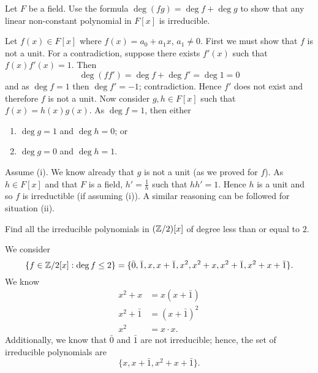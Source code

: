 \setcounter{question}{17}
\question Let $F$ be a field. Use the formula $\deg{(fg)} = \deg{f} + \deg{g}$ to show that any linear non-constant polynomial in $F[x]$ is irreducible.
\begin{solution}
    Let $f(x) \in F[x]$ where $f(x) = a_0 + a_1x$, $a_1 \neq 0$. First we must show that $f$ is not a unit. For a contradiction, suppose there exists $f'(x)$ such that $f(x)f'(x) = 1$. Then
    \[ \deg{(ff')} = \deg{f} + \deg{f'} = \deg{1} = 0 \]
    and as $\deg{f} = 1$ then $\deg{f'} = -1$; contradiction. Hence $f'$ does not exist and therefore $f$ is not a unit. Now consider $g, h \in F[x]$ such that $f(x) = h(x) g(x)$. As $\deg{f} = 1$, then either
    \begin{enumerate}
        \item $\deg{g} = 1$ and $\deg{h} = 0$; or
        \item $\deg{g} = 0$ and $\deg{h} = 1$.
    \end{enumerate}
    Assume (i). We know already that $g$ is not a unit (as we proved for $f$). As $h \in F[x]$ and that $F$ is a field, $h' = \frac1{h}$ such that $hh' = 1$. Hence $h$ is a unit and so $f$ is irreductible (if assuming (i)). A similar reasoning can be followed for situation (ii).
\end{solution}

\setcounter{question}{19}
\question Find all the irreducible polynomials in $(\mathbb{Z}/2)[x]$ of degree less than or equal to $2$.
\begin{solution}
    We consider
    \[ \{ f \in \mathbb{Z}/2[x] : \deg{f} \leq 2  \} = \{ \bar 0, \bar 1, x, x + \bar 1, x^2, x^2 + x, x^2 + \bar 1, x^2 + x + \bar 1 \}.  \]
    We know
    \begin{align*}
        x^2 + x &= x(x + \bar 1) \\
        x^2 + \bar 1 &= (x + \bar 1)^2 \\
        x^2 &= x \cdot x.
    \end{align*}
    Additionally, we know that $\bar 0$ and $\bar 1$ are not irreducible; hence, the set of irreducible polynomials are
    \[ \{ x, x + \bar 1, x^2 + x + \bar 1 \}. \]
\end{solution}
